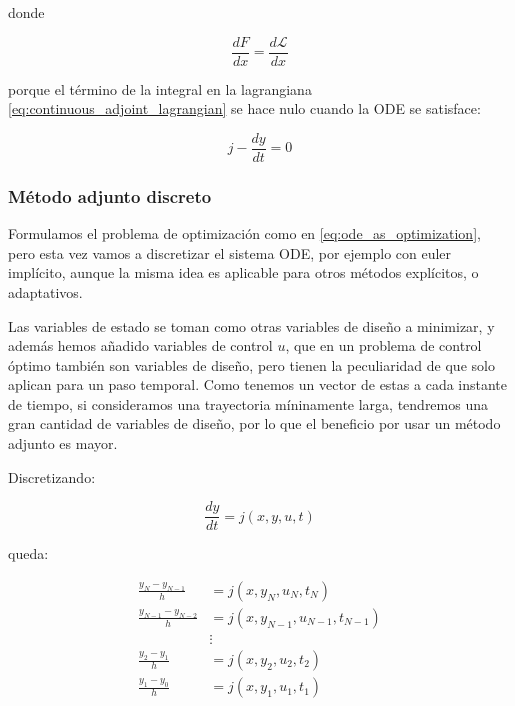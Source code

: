 donde

\begin{equation}
	\frac{dF}{d x} = \frac{d \mathcal{L}}{d x}
\end{equation}

porque el término de la integral en la lagrangiana
\eqref{eq:continuous_adjoint_lagrangian} se hace nulo cuando la ODE se
satisface:

\begin{equation}
	j - \frac{dy}{dt} = 0
\end{equation}


\subsubsection{Método adjunto discreto}

Formulamos el problema de optimización como en \ref{eq:ode_as_optimization},
pero esta vez vamos a discretizar el sistema ODE, por ejemplo con euler
implícito, aunque la misma idea es aplicable para otros métodos explícitos, o
adaptativos.

Las variables de estado se toman como otras variables de diseño a minimizar, y
además hemos añadido variables de control $u$, que en un problema de control
óptimo también son variables de diseño, pero tienen la peculiaridad de que solo
aplican para un paso temporal. Como tenemos un vector de estas a cada instante
de tiempo, si consideramos una trayectoria míninamente larga, tendremos una
gran cantidad de variables de diseño, por lo que el beneficio por usar un
método adjunto es mayor.

Discretizando:

\begin{equation}
	\frac{dy}{dt} = j(x, y, u, t)
\end{equation}

queda:

\begin{align}
	\frac{y_N - y_{N-1}}{h}     & = j(x, y_N, u_N, t_N) \nonumber             \\
	\frac{y_{N-1} - y_{N-2}}{h} & = j(x, y_{N-1}, u_{N-1}, t_{N-1}) \nonumber \\
	                            & \vdots \nonumber                            \\
	\frac{y_{2} - y_{1}}{h}     & = j(x, y_{2}, u_{2}, t_{2}) \nonumber       \\
	\frac{y_{1} - y_{0}}{h}     & = j(x, y_{1}, u_{1}, t_{1})                 \\
\end{align}


